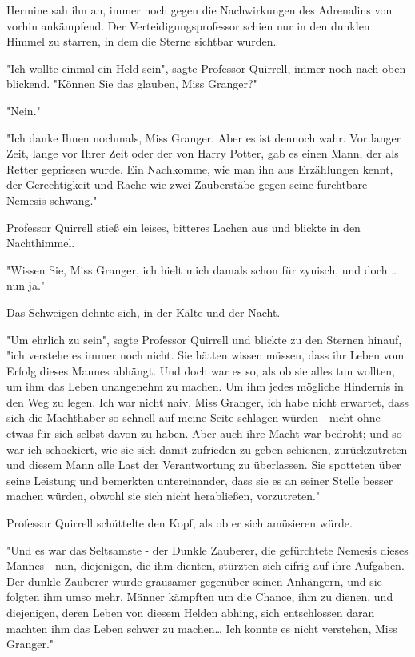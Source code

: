 {Hermine sah ihn an, immer noch gegen die Nachwirkungen des Adrenalins von vorhin ankämpfend. Der Verteidigungsprofessor schien nur in den dunklen Himmel zu starren, in dem die Sterne sichtbar wurden.

"Ich wollte einmal ein Held sein", sagte Professor Quirrell, immer noch nach oben blickend. "Können Sie das glauben, Miss Granger?"

"Nein."

"Ich danke Ihnen nochmals, Miss Granger. Aber es ist dennoch wahr. Vor langer Zeit, lange vor Ihrer Zeit oder der von Harry Potter, gab es einen Mann, der als Retter gepriesen wurde. Ein Nachkomme, wie man ihn aus Erzählungen kennt, der Gerechtigkeit und Rache wie zwei Zauberstäbe gegen seine furchtbare Nemesis schwang."

Professor Quirrell stieß ein leises, bitteres Lachen aus und blickte in den Nachthimmel.

"Wissen Sie, Miss Granger, ich hielt mich damals schon für zynisch, und doch … nun ja."

Das Schweigen dehnte sich, in der Kälte und der Nacht.

"Um ehrlich zu sein", sagte Professor Quirrell und blickte zu den Sternen hinauf, "ich verstehe es immer noch nicht. Sie hätten wissen müssen, dass ihr Leben vom Erfolg dieses Mannes abhängt. Und doch war es so, als ob sie alles tun wollten, um ihm das Leben unangenehm zu machen. Um ihm jedes mögliche Hindernis in den Weg zu legen. Ich war nicht naiv, Miss Granger, ich habe nicht erwartet, dass sich die Machthaber so schnell auf meine Seite schlagen würden - nicht ohne etwas für sich selbst davon zu haben. Aber auch ihre Macht war bedroht; und so war ich schockiert, wie sie sich damit zufrieden zu geben schienen, zurückzutreten und diesem Mann alle Last der Verantwortung zu überlassen. Sie spotteten über seine Leistung und bemerkten untereinander, dass sie es an seiner Stelle besser machen würden, obwohl sie sich nicht herabließen, vorzutreten."

Professor Quirrell schüttelte den Kopf, als ob er sich amüsieren würde.

"Und es war das Seltsamste - der Dunkle Zauberer, die gefürchtete Nemesis dieses Mannes - nun, diejenigen, die ihm dienten, stürzten sich eifrig auf ihre Aufgaben. Der dunkle Zauberer wurde grausamer gegenüber seinen Anhängern, und sie folgten ihm umso mehr. Männer kämpften um die Chance, ihm zu dienen, und diejenigen, deren Leben von diesem Helden abhing, sich entschlossen daran machten ihm das Leben schwer zu machen… Ich konnte es nicht verstehen, Miss Granger."

}
